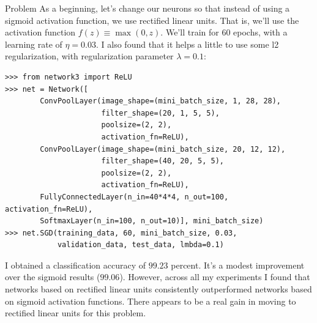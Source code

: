 \begin{exerciseBox}{Problem}
As a beginning, let's change our neurons so that instead of using a sigmoid activation function, we use rectified linear units. That is, we'll use the activation function $f(z) \equiv \max(0, z)$. We'll train for $60$ epochs, with a learning rate of $\eta = 0.03$. I also found that it helps a little to use some l2 regularization, with regularization parameter $\lambda = 0.1$:



\begin{lstlisting}
>>> from network3 import ReLU
>>> net = Network([
        ConvPoolLayer(image_shape=(mini_batch_size, 1, 28, 28), 
                      filter_shape=(20, 1, 5, 5), 
                      poolsize=(2, 2), 
                      activation_fn=ReLU),
        ConvPoolLayer(image_shape=(mini_batch_size, 20, 12, 12), 
                      filter_shape=(40, 20, 5, 5), 
                      poolsize=(2, 2), 
                      activation_fn=ReLU),
        FullyConnectedLayer(n_in=40*4*4, n_out=100, activation_fn=ReLU),
        SoftmaxLayer(n_in=100, n_out=10)], mini_batch_size)
>>> net.SGD(training_data, 60, mini_batch_size, 0.03, 
            validation_data, test_data, lmbda=0.1)

\end{lstlisting}


I obtained a classification accuracy of $99.23$ percent. It's a modest improvement over the sigmoid results ($99.06$). However, across all my experiments I found that networks based on rectified linear units consistently outperformed networks based on sigmoid activation functions. There appears to be a real gain in moving to rectified linear units for this problem.



\end{exerciseBox}
